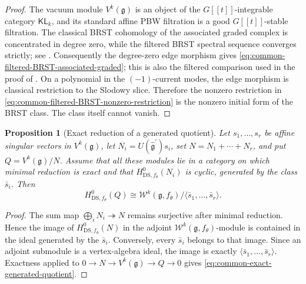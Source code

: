 \documentclass[11pt,reqno]{amsart}
\newtheorem{proposition}[theorem]{Proposition}
\theoremstyle{definition}
\theoremstyle{remark}
\begin{document}
\begin{proof}
The vacuum module $V^k(\mathfrak g)$ is an object of the
$G[[t]]$-integrable category $\mathsf{KL}_k$, and its standard affine PBW
filtration is a good $G[[t]]$-stable filtration.  The classical BRST
cohomology of the associated graded complex is concentrated in degree
zero, while the filtered BRST spectral sequence converges strictly; see
\cite[Theorems~4.3.3 and~4.4.6]{Arakawa2015}.  Consequently the degree-zero
edge morphism gives \eqref{eq:common-filtered-BRST-associated-graded}; this
is also the filtered comparison used in the proof of
\cite[Theorem~4.5.2]{Arakawa2015}.  On a polynomial in the $(-1)$-current modes, the edge morphism is
classical restriction to the Slodowy slice.
Therefore the nonzero restriction in
\eqref{eq:common-filtered-BRST-nonzero-restriction} is the nonzero initial
form of the BRST class.  The class itself cannot vanish.
\end{proof}

\begin{proposition}[Exact reduction of a generated quotient]
\label{prop:common-exact-generated-quotient}
Let $s_1,\ldots,s_r$ be affine singular vectors in $V^k(\mathfrak g)$,
let $N_i=U(\widehat{\mathfrak g}^{\prime})s_i$, set
$N=N_1+\cdots+N_r$, and put $Q=V^k(\mathfrak g)/N$.  Assume that all
these modules lie in a category on which minimal reduction is exact and
that $H^0_{\mathrm{DS},f_\theta}(N_i)$ is cyclic, generated by the class
$\bar s_i$.  Then
\begin{equation}
 H^0_{\mathrm{DS},f_\theta}(Q)
 \cong
 \mathcal W^k(\mathfrak g,f_\theta)
 \big/\langle\bar s_1,\ldots,\bar s_r\rangle.
 \label{eq:common-exact-generated-quotient}
\end{equation}
\end{proposition}

\begin{proof}
The sum map $\bigoplus_iN_i\twoheadrightarrow N$ remains surjective after
minimal reduction.  Hence the image of $H^0_{\mathrm{DS},f_\theta}(N)$
in the adjoint $\mathcal W^k(\mathfrak g,f_\theta)$-module is contained
in the ideal generated by the $\bar s_i$.  Conversely, every $\bar s_i$
belongs to that image.  Since an adjoint submodule is a vertex-algebra
ideal, the image is exactly $\langle\bar s_1,\ldots,\bar s_r\rangle$.
Exactness applied to $0\to N\to V^k(\mathfrak g)\to Q\to0$ gives
\eqref{eq:common-exact-generated-quotient}.
\end{proof}
\end{document}
